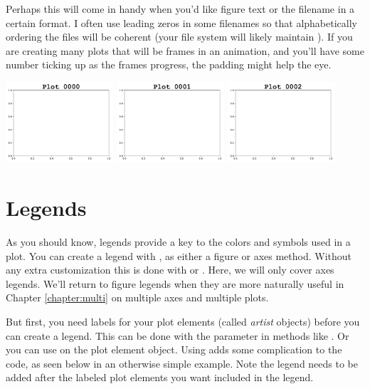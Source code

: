Perhaps this will come in handy when you'd like figure text or the filename in a certain format. I often use leading zeros in some filenames so that alphabetically ordering the files will be coherent (your file system will likely maintain ). If you are creating many plots that will be frames in an animation, and you'll have some number ticking up as the frames progress, the padding might help the eye.  


\begin{center}
    \includegraphics[width = 0.3\textwidth]{figures/proseplots/0000.pdf} \includegraphics[width = 0.3\textwidth]{figures/proseplots/0001.pdf}
     \includegraphics[width = 0.3\textwidth]{figures/proseplots/0002.pdf}
\end{center}

\section{Legends}
As you should know, legends provide a key to the colors and symbols used in a plot. You can create a legend with , as either a figure or axes method. Without any extra customization this is done with  or . Here, we will only cover axes legends. We'll return to figure legends when they are more naturally useful in Chapter \ref{chapter:multi} on multiple axes and multiple plots. 

But first, you need labels for your plot elements (called \emph{artist} objects) before you can create a legend. This can be done with the  parameter in methods like . Or you can use  on the plot element object. Using  adds some complication to the code, as seen below in an otherwise simple example. Note the legend needs to be added after the labeled plot elements you want included in the legend.


